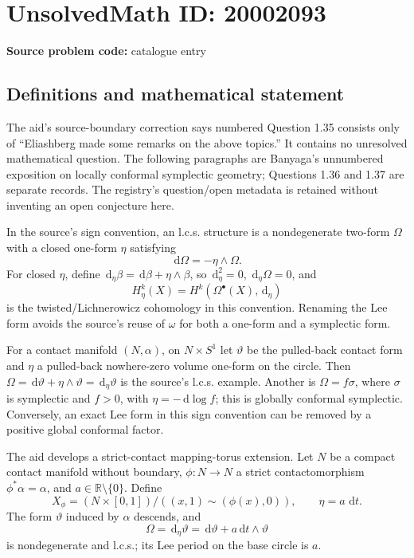 \documentclass[11pt]{article}
\newcommand{\R}{\mathbb{R}}
\newcommand{\dd}{\,\mathrm{d}}
\begin{document}
\section*{UnsolvedMath ID: 20002093}
\textbf{Source problem code:} catalogue entry
\subsection{Definitions and mathematical statement}
The aid's source-boundary correction says numbered Question 1.35 consists only of ``Eliashberg made some remarks on the above topics.'' It contains no unresolved mathematical question. The following paragraphs are Banyaga's unnumbered exposition on locally conformal symplectic geometry; Questions 1.36 and 1.37 are separate records. The registry's question/open metadata is retained without inventing an open conjecture here.

In the source's sign convention, an l.c.s. structure is a nondegenerate two-form \(\Omega\) with a closed one-form \(\eta\) satisfying
\[
 \dd\Omega=-\eta\wedge\Omega.
\]
For closed \(\eta\), define \(\dd_\eta\beta=\dd\beta+\eta\wedge\beta\), so \(\dd_\eta^2=0\), \(\dd_\eta\Omega=0\), and
\[
 H_\eta^k(X)=H^k(\Omega^\bullet(X),\dd_\eta)
\]
is the twisted/Lichnerowicz cohomology in this convention. Renaming the Lee form avoids the source's reuse of \(\omega\) for both a one-form and a symplectic form.

For a contact manifold \((N,\alpha)\), on \(N\times S^1\) let \(\vartheta\) be the pulled-back contact form and \(\eta\) a pulled-back nowhere-zero volume one-form on the circle. Then
\(\Omega=\dd\vartheta+\eta\wedge\vartheta=\dd_\eta\vartheta\)
is the source's l.c.s. example. Another is \(\Omega=f\sigma\), where \(\sigma\) is symplectic and \(f>0\), with \(\eta=-\dd\log f\); this is globally conformal symplectic. Conversely, an exact Lee form in this sign convention can be removed by a positive global conformal factor.

The aid develops a strict-contact mapping-torus extension. Let \(N\) be a compact contact manifold without boundary, \(\phi:N\to N\) a strict contactomorphism \(\phi^*\alpha=\alpha\), and \(a\in\R\setminus\{0\}\). Define
\[
 X_\phi=(N\times[0,1])/((x,1)\sim(\phi(x),0)),
 \qquad \eta=a\,\dd t.
\]
The form \(\vartheta\) induced by \(\alpha\) descends, and
\[
 \Omega=\dd_\eta\vartheta=\dd\vartheta+a\dd t\wedge\vartheta
\]
is nondegenerate and l.c.s.; its Lee period on the base circle is \(a\).
\end{document}

